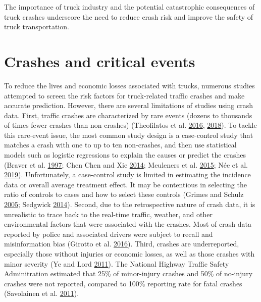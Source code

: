 \documentclass[12pt]{book}
\numberwithin{equation}{chapter}
\begin{document}
The importance of truck industry and the potential catastrophic consequences of truck crashes underscore the need to reduce crash risk and improve the safety of truck transportation.

\hypertarget{crashes-and-critical-events}{%
\section{Crashes and critical events}\label{crashes-and-critical-events}}

To reduce the lives and economic losses associated with trucks, numerous studies attempted to screen the risk factors for truck-related traffic crashes and make accurate prediction. However, there are several limitations of studies using crash data. First, traffic crashes are characterized by rare events (dozens to thousands of times fewer crashes than non-crashes) (Theofilatos et al. \protect\hyperlink{ref-theofilatos2016predicting}{2016}, \protect\hyperlink{ref-theofilatos2018impact}{2018}). To tackle this rare-event issue, the most common study design is a case-control study that matches a crash with one to up to ten non-crashes, and then use statistical models such as logistic regressions to explain the causes or predict the crashes (Braver et al. \protect\hyperlink{ref-braver1997tractor}{1997}; Chen Chen and Xie \protect\hyperlink{ref-chen2014modeling}{2014}; Meuleners et al. \protect\hyperlink{ref-meuleners2015obstructive}{2015}; Née et al. \protect\hyperlink{ref-nee2019road}{2019}). Unfortunately, a case-control study is limited in estimating the incidence data or overall average treatment effect. It may be contentious in selecting the ratio of controls to cases and how to select these controls (Grimes and Schulz \protect\hyperlink{ref-grimes2005compared}{2005}; Sedgwick \protect\hyperlink{ref-sedgwick2014case}{2014}). Second, due to the retrospective nature of crash data, it is unrealistic to trace back to the real-time traffic, weather, and other environmental factors that were associated with the crashes. Most of crash data reported by police and associated drivers were subject to recall and misinformation bias (Girotto et al. \protect\hyperlink{ref-girotto2016professional}{2016}). Third, crashes are underreported, especially those without injuries or economic losses, as well as those crashes with minor severity (Ye and Lord \protect\hyperlink{ref-ye2011investigation}{2011}). The National Highway Traffic Safety Adminitration estimated that 25\% of minor-injury crashes and 50\% of no-injury crashes were not reported, compared to 100\% reporting rate for fatal crashes (Savolainen et al. \protect\hyperlink{ref-savolainen2011statistical}{2011}).
\end{document}
